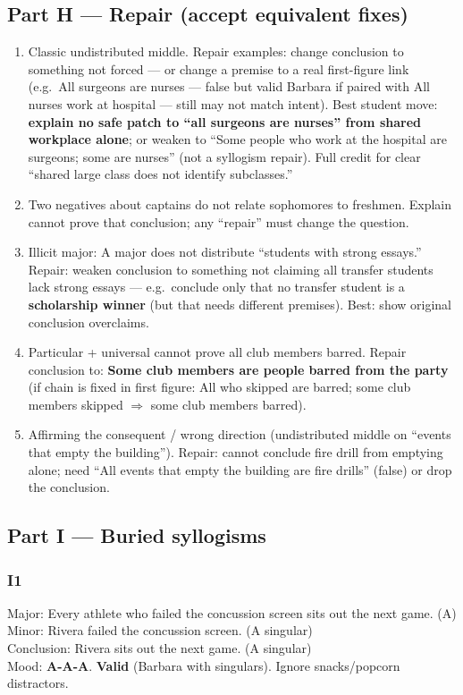 \documentclass[11pt]{article}
\begin{document}
\subsection*{Part H --- Repair (accept equivalent fixes)}
\begin{enumerate}
\item Classic undistributed middle. Repair examples: change conclusion to something not forced --- or change a premise to a real first-figure link (e.g.\ All surgeons are nurses --- false but valid Barbara if paired with All nurses work at hospital --- still may not match intent). Best student move: \textbf{explain no safe patch to ``all surgeons are nurses'' from shared workplace alone}; or weaken to ``Some people who work at the hospital are surgeons; some are nurses'' (not a syllogism repair). Full credit for clear ``shared large class does not identify subclasses.''
\item Two negatives about captains do not relate sophomores to freshmen. Explain cannot prove that conclusion; any ``repair'' must change the question.
\item Illicit major: A major does not distribute ``students with strong essays.'' Repair: weaken conclusion to something not claiming all transfer students lack strong essays --- e.g.\ conclude only that no transfer student is a \textbf{scholarship winner} (but that needs different premises). Best: show original conclusion overclaims.
\item Particular + universal cannot prove all club members barred. Repair conclusion to: \textbf{Some club members are people barred from the party} (if chain is fixed in first figure: All who skipped are barred; some club members skipped $\Rightarrow$ some club members barred).
\item Affirming the consequent / wrong direction (undistributed middle on ``events that empty the building''). Repair: cannot conclude fire drill from emptying alone; need ``All events that empty the building are fire drills'' (false) or drop the conclusion.
\end{enumerate}

\subsection*{Part I --- Buried syllogisms}
\subsubsection*{I1}
Major: Every athlete who failed the concussion screen sits out the next game. (A)\\
Minor: Rivera failed the concussion screen. (A singular)\\
Conclusion: Rivera sits out the next game. (A singular)\\
Mood: \textbf{A-A-A}. \textbf{Valid} (Barbara with singulars). Ignore snacks/popcorn distractors.
\end{document}
